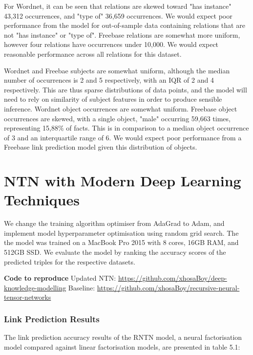 \noindent For Wordnet, it can be seen that relations are skewed toward "has instance" 43,312 occurrences, and "type of" 36,659 occurrences. We would expect poor performance from the model for out-of-sample data containing relations that are not "has instance" or "type of". Freebase relations are somewhat more uniform, however four relations have occurrences under 10,000. We would expect reasonable performance across all relations for this dataset. \par

\noindent Wordnet and Freebae subjects are somewhat uniform, although the median number of occurrences is 2 and 5 respectively, with an IQR of 2 and 4 respectively. This are thus sparse distributions of data points, and the model will need to rely on  similarity of subject features in order to produce sensible inference. Wordnet object occurrences are somewhat uniform. Freebase object occurrences are skewed, with a single object, "male" occurring 59,663 times, representing 15,88\% of facts. This is in comparison to a median object occurrence of 3 and an interquartile range of 6. We would expect poor performance from a Freebase link prediction model given this distribution of objects. 



\section{NTN with Modern Deep Learning Techniques}

\noindent We change the training algorithm optimiser from AdaGrad to Adam, and implement model hyperparameter optimisation using random grid search. The the model was trained on a MacBook Pro 2015 with 8 cores, 16GB RAM, and 512GB SSD. We evaluate the model by ranking the accuracy scores of the predicted triples for the respective datasets. \bigskip

\noindent \textbf{Code to reproduce} \newline
Updated NTN:  \url{https://github.com/xhosaBoy/deep-knowledge-modelling} \newline
Baseline: \url{https://github.com/xhosaBoy/recursive-neural-tensor-networks}

\subsubsection{Link Prediction Results}
The link prediction accuracy results of the RNTN model, a neural factorisation model compared against linear factorisation models, are presented in table 5.1:

